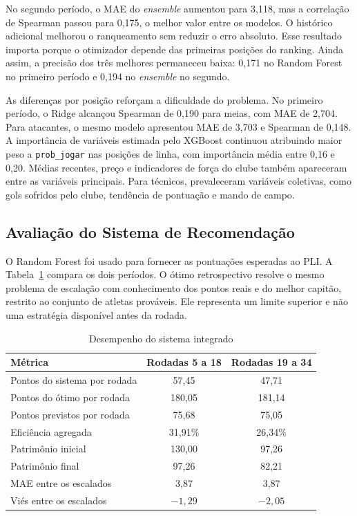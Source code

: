 \documentclass[12pt, a4paper, oneside]{article}
\begin{document}
No segundo período, o MAE do \textit{ensemble} aumentou para 3,118, mas a
correlação de Spearman passou para 0,175, o melhor valor entre os modelos. O
histórico adicional melhorou o ranqueamento sem reduzir o erro absoluto. Esse
resultado importa porque o otimizador depende das primeiras posições do ranking.
Ainda assim, a precisão dos três melhores permaneceu baixa: 0,171 no Random Forest
no primeiro período e 0,194 no \textit{ensemble} no segundo.

As diferenças por posição reforçam a dificuldade do problema. No primeiro período,
o Ridge alcançou Spearman de 0,190 para meias, com MAE de 2,704. Para atacantes,
o mesmo modelo apresentou MAE de 3,703 e Spearman de 0,148. A importância de
variáveis estimada pelo XGBoost continuou atribuindo maior peso a
\texttt{prob\_jogar} nas posições de linha, com importância média entre 0,16 e
0,20. Médias recentes, preço e indicadores de força do clube também apareceram
entre as variáveis principais. Para técnicos, prevaleceram variáveis coletivas,
como gols sofridos pelo clube, tendência de pontuação e mando de campo.

\subsection{Avaliação do Sistema de Recomendação}

O Random Forest foi usado para fornecer as pontuações esperadas ao PLI. A
Tabela~\ref{tab:sistema} compara os dois períodos. O ótimo retrospectivo resolve
o mesmo problema de escalação com conhecimento dos pontos reais e do melhor
capitão, restrito ao conjunto de atletas prováveis. Ele representa um limite
superior e não uma estratégia disponível antes da rodada.

\begin{table}[H]
\centering
\small
\caption{Desempenho do sistema integrado}
\label{tab:sistema}
\begin{tabular}{lcc}
\toprule
\textbf{Métrica} & \textbf{Rodadas 5 a 18} & \textbf{Rodadas 19 a 34}\\
\midrule
Pontos do sistema por rodada       & 57,45 & 47,71\\
Pontos do ótimo por rodada         & 180,05 & 181,14\\
Pontos previstos por rodada        & 75,68 & 75,05\\
Eficiência agregada                & 31,91\% & 26,34\%\\
Patrimônio inicial                 & 130,00 & 97,26\\
Patrimônio final                   & 97,26 & 82,21\\
MAE entre os escalados             & 3,87 & 3,87\\
Viés entre os escalados            & $-1,29$ & $-2,05$\\
\bottomrule
\end{tabular}
\end{table}
\end{document}

